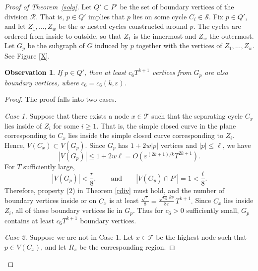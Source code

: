 \documentclass[11pt]{article}
\theoremstyle{plain}
\newtheorem{observation}[theorem]{Observation}
\theoremstyle{definition}
\theoremstyle{remark}
\begin{document}
\begin{proof}[Proof of Theorem~\ref{soly}]
 

Let \(Q' \subset P'\) be the set of boundary vertices of the division \(\mathcal R\).  That is, \(p\in Q'\) implies that \(p\) lies on some cycle \(C_i\in\mathcal S\). Fix \(p\in Q'\), and let \(Z_1,\dots,Z_w\) be the $w$ nested cycles constructed around $p$.  The cycles are ordered from inside to outside, so that \(Z_1\) is the innermost and \(Z_w\) the outermost. Let \(G_p\) be the subgraph of \(G\) induced by \(p\) together with the vertices of \(Z_1,\dots,Z_w\).  See Figure \ref{X}.














\begin{observation}
If $p \in Q'$, then at least  $c_6T^{k + 1}$ vertices from $G_p$ are also boundary vertices, where $c_6 = c_6(k,\varepsilon)$.
\end{observation}





\begin{proof}
 
The proof falls into two cases.

\medskip
\noindent\emph{Case 1.} Suppose that there exists a node \(x\in\mathcal T\) such that the separating cycle $C_x$ lies inside of $Z_i$ for some $i\geq 1$. That is, the simple closed curve in the plane corresponding to $C_x$ lies inside the simple closed curve corresponding to $Z_i$.  Hence, $V(C_x) \subset V(G_p)$.   Since \(G_p\) has \(1+2w|p|\) vertices and \(|p|\le \ell\), we have
\[
|V(G_p)| \le 1+2w\ell = O\!\left(\varepsilon^{(2k+1)/k}T^{2k+1}\right).
\]
For \(T\) sufficiently large,
\[
|V(G_p)|<\frac r8,
\qquad\text{and}\qquad
|V(G_p)\cap P'|=1<\frac t8.
\]
Therefore, property (2) in Theorem \ref{rdiv} must hold, and the number of boundary vertices inside or on \(C_x\) is at least $\frac{\sqrt r}{8}
=
\frac{\sqrt{c_5}\,ks}{8\varepsilon}\,
T^{k+1}.$  Since \(C_x\) lies inside $Z_i$, all of these boundary vertices lie in \(G_p\). Thus for $c_6 > 0$ sufficiently small, \(G_p\) contains at least $c_6 T^{k+1}$ boundary vertices.

\medskip
\noindent\emph{Case 2.} Suppose we are not in Case 1.  Let \(x\in\mathcal T\) be the highest node such that \(p\in V(C_x)\), and let \(R_x\) be the corresponding region. 


\end{proof}
\end{proof}
\end{document}
